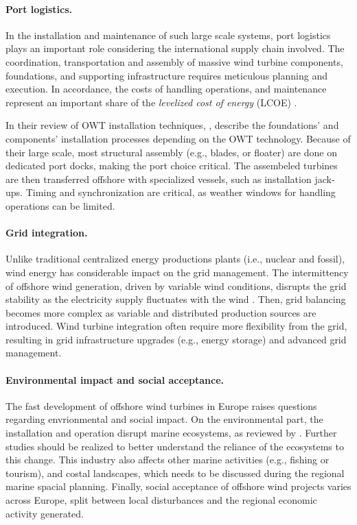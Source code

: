 \paragraph{Port logistics.}
In the installation and maintenance of such large scale systems, port logistics plays an important role considering the international supply chain involved. 
The coordination, transportation and assembly of massive wind turbine components, foundations, and supporting infrastructure requires meticulous planning and execution. 
In accordance, the costs of handling operations, and maintenance represent an important share of the \textit{levelized cost of energy} (LCOE) \citep{shields_2021_owt_lcoe}.  

In their review of OWT installation techniques, \citet{jiang_2021_owt_installation_review}, describe the foundations' and components' installation processes depending on the OWT technology. 
Because of their large scale, most structural assembly (e.g., blades, or floater) are done on dedicated port docks, making the port choice critical.  
The assembeled turbines are then transferred offshore with specialized vessels, such as installation jack-ups. 
Timing and synchronization are critical, as weather windows for handling operations can be limited.


\paragraph{Grid integration.}
Unlike traditional centralized energy productions plants (i.e., nuclear and fossil), wind energy has considerable impact on the grid management. 
The intermittency of offshore wind generation, driven by variable wind conditions, disrupts the grid stability as the electricity supply fluctuates with the wind \citep{heier_2014_grid_integration}. 
Then, grid balancing becomes more complex as variable and distributed production sources are introduced.  
Wind turbine integration often require more flexibility from the grid, resulting in grid infrastructure upgrades (e.g., energy storage) and advanced grid management. 




\paragraph{Environmental impact and social acceptance.} 
The fast development of offshore wind turbines in Europe raises questions regarding envrionmental and social impact. 
On the environmental part, the installation and operation disrupt marine ecosystems, as reviewed by \citet{galparsoro_2022_owt_ecological_impact}. 
Further studies should be realized to better understand the reliance of the ecosystems to this change. 
This industry also affects other marine activities (e.g., fishing or tourism), and costal landscapes, which needs to be discussed during the regional marine spacial planning. 
Finally, social acceptance of offshore wind projects varies across Europe, split between local disturbances and the regional economic activity generated.  


